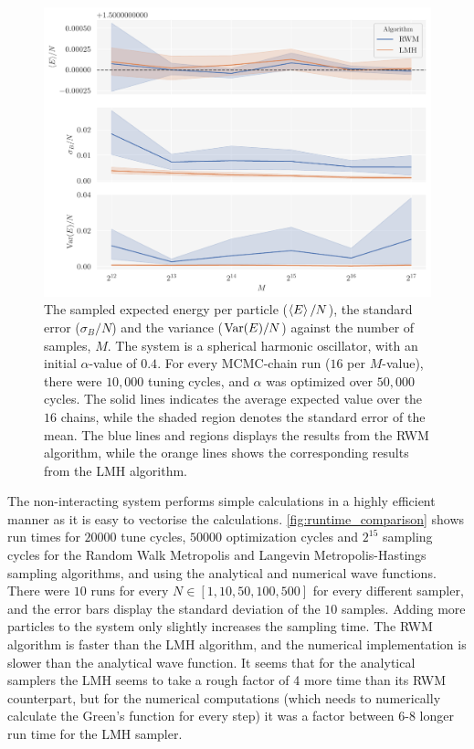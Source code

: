 \begin{figure}[!htb]
\begin{center}\includegraphics[width=\textwidth]{latex/figures/ashonib_N100_rwm_vs_lmh.pdf}
\end{center}
\caption{The sampled expected energy per particle ($\expval{E}/N$), the standard error ($\sigma_B/N$) and the variance ($\mathrm{Var}\qty(E)/N$) against the number of samples, $M$. The system is a spherical harmonic oscillator, with an initial $\alpha$-value of $0.4$. For every MCMC-chain run ($16$ per $M$-value), there were $10,000$ tuning cycles, and $\alpha$ was optimized over $50,000$ cycles. The solid lines indicates the average expected value over the $16$ chains, while the shaded region denotes the standard error of the mean. The blue lines and regions displays the results from the RWM algorithm, while the orange lines shows the corresponding results from the LMH algorithm.}
\label{fig:rwm_vs_lmh}
\end{figure}



The non-interacting system performs simple calculations in a highly efficient manner as it is easy to vectorise the calculations. \autoref{fig:runtime_comparison} shows run times for $20000$ tune cycles, $50000$ optimization cycles and $2^{15}$ sampling cycles for the Random Walk Metropolis and Langevin Metropolis-Hastings sampling algorithms, and using the analytical and numerical wave functions. There were $10$ runs for every $N\in[1, 10, 50, 100, 500]$ for every different sampler, and the error bars display the standard deviation of the $10$ samples. Adding more particles to the system only slightly increases the sampling time. The RWM algorithm is faster than the LMH algorithm, and the numerical implementation is slower than the analytical wave function. It seems that for the analytical samplers the LMH seems to take a rough factor of 4 more time than its RWM counterpart, but for the numerical computations (which needs to numerically calculate the Green's function for every step) it was a factor between 6-8 longer run time for the LMH sampler. 


